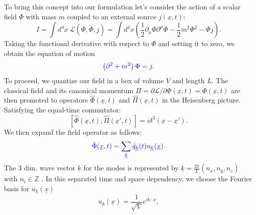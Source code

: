 \documentclass[12pt, titlepage]{article}
\begin{document}
To bring this concept into our formulation let's consider 
the action of a scalar field $ \Phi $ with mass $ m $ coupled to an external source $ j(\underline{x},t) $:
\begin{equation}
I=\int d^{4}x \ \mathcal{L}(\Phi, \dot{\Phi},j)=
\int d^{4}x 
\left(
\frac{1}{2}\partial_{\mu}\Phi\partial^{\mu}\Phi
-\frac{1}{2}m^{2}\Phi^{2}
-\Phi j
 \right)
 .
\end{equation}
Taking the functional derivative with respect to $ \Phi $ and setting it to zero, we obtain the equation of motion
\begin{equation}\label{motion_scalar}
\textcolor[RGB]{0,0,204}{
\left(
\partial^{2}+m^{2}
 \right)\Phi
 =j
 .}
\end{equation}
To proceed, we quantize our field in a box of volume $ V $ and length $ L $. The classical field and its canonical momentum $ \Pi = \partial \mathcal{L} /\partial\dot{\Phi}(\underline{x},t)=\dot{\Phi}(\underline{x},t) $ are then promoted to operators $ \hat{\Phi}(\underline{x},t) $ and  $ \hat{\Pi}(\underline{x},t) $ in the Heisenberg picture. Satisfying the equal-time commutator:
\begin{equation}
\left[
\hat{\Phi}(\underline{x},t),\hat{\Pi}(\underline{x}',t)
 \right] 
 =
 i
 \delta^{3}
 (\underline{x} - \underline{x}')
 .
\end{equation}
We then expand the field operator as follows:
\begin{equation}\label{box_quanta}
\textcolor[RGB]{0,0,204}{
\hat{\Phi} (\underline{x},t)= \sum_{\underline{k}} \hat{q}_{\underline{k}}(t)u_{\underline{k}}(\underline{x})
 .}
\end{equation}
The 3 dim. wave vector $ \underline{k} $ for the modes is represented by $ \underline{k} = \frac{2\pi}{L}(n_{x},n_{y},n_{z}) $ with $ n_{i}\in \mathbb{Z} $ . 
	In this separated time and space dependency, we choose the Fourier basis for $ u_{\underline{k}}(\underline{x}) $
\begin{equation}\label{fourierbasis}
u_{\underline{k}}(\underline{x})
=
\dfrac{1}{\sqrt{V}} e^{i\underline{k}\cdot \underline{x}}
,
\end{equation}
\end{document}
